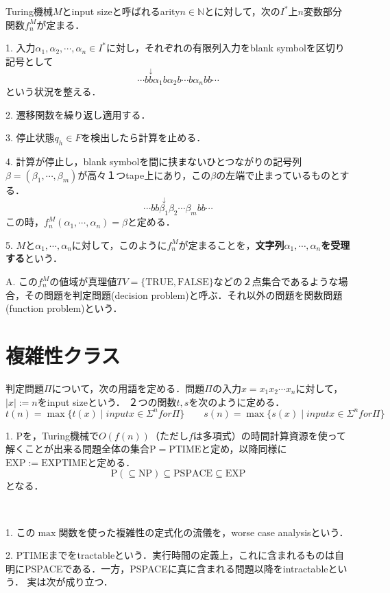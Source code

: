 \documentclass[uplatex, dvipdfmx]{jsreport}
\begin{document}
\begin{screen}\begin{definition}[部分関数への翻訳埋め込み]
    Turing機械$M$とinput sizeと呼ばれるarity$n\in\mathbb{N}$とに対して，次の$I^*$上$n$変数部分関数$f^M_n$が定まる．

    1. 入力$\alpha_1,\alpha_2,\cdots,\alpha_n\in I^*$に対し，それぞれの有限列入力をblank symbolを区切り記号として
    \[ \cdots b\overset{\downarrow}{b}\alpha_1b\alpha_2b\cdots b\alpha_nbb\cdots \]
    という状況を整える．

    2. 遷移関数を繰り返し適用する．

    3. 停止状態$q_h\in F$を検出したら計算を止める．

    4. 計算が停止し，blank symbolを間に挟まないひとつながりの記号列$\beta=(\beta_1,\cdots,\beta_m)$が高々１つtape上にあり，この$\beta$の左端で止まっているものとする．
    \[ \cdots bb\overset{\downarrow}{\beta_1}\beta_2\cdots\beta_mbb\cdots \]
    この時，$f^M_n(\alpha_1,\cdots,\alpha_n)=\beta$と定める．

    5. $M$と$\alpha_1,\cdots,\alpha_n$に対して，このように$f^M_n$が定まることを，\textbf{文字列$\alpha_1,\cdots,\alpha_n$を受理する}という．

    A. この$f^M_n$の値域が真理値$TV=\{\mathrm{TRUE, FALSE}\}$などの２点集合であるような場合，その問題を判定問題(decision problem)と呼ぶ．それ以外の問題を関数問題(function problem)という．
\end{definition}\end{screen}

\section{複雑性クラス}

\begin{definition}
    判定問題$\Pi$について，次の用語を定める．問題$\Pi$の入力$x=x_1x_2\cdots x_n$に対して，$|x|:=n$をinput sizeという．
    ２つの関数$t,s$を次のように定める．
    \[ t(n)=\max\{t(x)\mid input x\in\Sigma^n for\Pi\} \hspace{2em}
    s(n)=\max\{s(x)\mid input x\in\Sigma^n for\Pi\} \]

    1. $\mathrm{P}$を，Turing機械で$O(f(n))$（ただし$f$は多項式）の時間計算資源を使って解くことが出来る問題全体の集合$\mathrm{P}=\mathrm{PTIME}$と定め，以降同様に$\mathrm{EXP}:=\mathrm{EXPTIME}$と定める．
    \[\mathrm{P}(\subseteq\mathrm{NP})\subseteq\mathrm{PSPACE}\subseteq\mathrm{EXP}\]
    となる．
\end{definition}
\begin{remark}　
    
    1. この$\max$関数を使った複雑性の定式化の流儀を，worse case analysisという．

    2. PTIMEまでをtractableという．実行時間の定義上，これに含まれるものは自明にPSPACEである．一方，PSPACEに真に含まれる問題以降をintractableという．
    実は次が成り立つ．
\end{remark}
\end{document}
